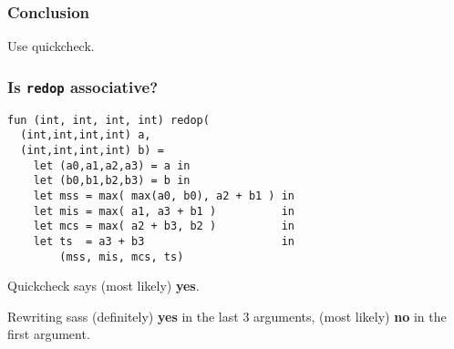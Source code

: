 \begin{frame}[plain]

\frametitle{Conclusion}

\begin{center}
Use quickcheck.
\end{center}

\end{frame}

\begin{frame}

\frametitle{Is \texttt{redop} associative?}

\begin{verbatim}
fun (int, int, int, int) redop(
  (int,int,int,int) a, 
  (int,int,int,int) b) =
    let (a0,a1,a2,a3) = a in
    let (b0,b1,b2,b3) = b in
    let mss = max( max(a0, b0), a2 + b1 ) in
    let mis = max( a1, a3 + b1 )          in
    let mcs = max( a2 + b3, b2 )          in
    let ts  = a3 + b3                     in
        (mss, mis, mcs, ts)
\end{verbatim}

Quickcheck says (most likely) \textbf{yes}.

Rewriting sass (definitely) \textbf{yes} in the last 3 arguments, (most likely)
\textbf{no} in the first argument.

\end{frame}

